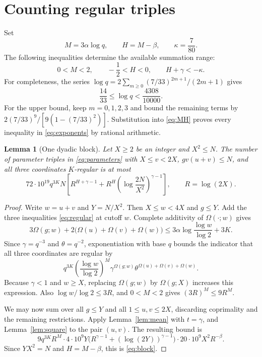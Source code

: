 \documentclass[11pt]{amsart}
\newtheorem{lemma}[theorem]{Lemma}
\theoremstyle{definition}
\theoremstyle{remark}
\numberwithin{equation}{section}
\newcommand{\Om}{\Omega}
\begin{document}
\section{Counting regular triples}\label{sec:count}

Set
\begin{equation}\label{eq:MH}
M=3\alpha\log q,\qquad H=M-\beta,\qquad\kappa=\frac7{80}.
\end{equation}
The following inequalities determine the available summation range:
\begin{equation}\label{eq:exponents}
0<M<2,\qquad -\frac12<H<0,\qquad H+\gamma<-\kappa.
\end{equation}
For completeness, the series
$\log q=2\sum_{m\ge0}(7/33)^{2m+1}/(2m+1)$ gives
\[
\frac{14}{33}\le\log q<\frac{4308}{10000}.
\]
For the upper bound, keep $m=0,1,2,3$ and bound the remaining terms by
$2(7/33)^9/[9(1-(7/33)^2)]$.
Substitution into \eqref{eq:MH} proves every inequality in \eqref{eq:exponents} by rational arithmetic.

\begin{lemma}[One dyadic block]\label{lem:block}
Let $X\ge2$ be an integer and $X^2\le N$.
The number of parameter triples in \eqref{eq:parameters} with
$X\le v<2X$, $gv(u+v)\le N$, and all three coordinates $K$-regular is at most
\begin{equation}\label{eq:block}
72\cdot10^{19}q^{3K}N
\left[R^{H+\gamma-1}+R^H\left(\log\frac{2N}{X^2}\right)^{\gamma-1}\right],
\qquad R=\log(2X).
\end{equation}
\end{lemma}

\begin{proof}
Write $w=u+v$ and $Y=N/X^2$.
Then $X\le w<4X$ and $g\le Y$.
Add the three inequalities \eqref{eq:regular} at cutoff $w$.
Complete additivity of $\Om(\cdot;w)$ gives
\[
3\Om(g;w)+2\bigl(\Om(u)+\Om(v)+\Om(w)\bigr)
\le3\alpha\log\frac{\log w}{\log2}+3K.
\]
Since $\gamma=q^{-3}$ and $\theta=q^{-2}$, exponentiation with base $q$ bounds the indicator that all three coordinates are regular by
\begin{equation}\label{eq:pointweight}
q^{3K}\left(\frac{\log w}{\log2}\right)^M
\gamma^{\Om(g;w)}\theta^{\Om(u)+\Om(v)+\Om(w)}.
\end{equation}
Because $\gamma<1$ and $w\ge X$, replacing $\Om(g;w)$ by $\Om(g;X)$ increases this expression.
Also $\log w/\log2\le3R$, and $0<M<2$ gives $(3R)^M\le9R^M$.

We may now sum over all $g\le Y$ and all $1\le u,v\le2X$, discarding coprimality and the remaining restrictions.
Apply Lemma~\ref{lem:mean} with $t=\gamma$, and Lemma~\ref{lem:square} to the pair $(u,v)$.
The resulting bound is
\[
9q^{3K}R^M\cdot4\cdot10^9Y
\bigl(R^{\gamma-1}+(\log(2Y))^{\gamma-1}\bigr)
\cdot20\cdot10^9X^2R^{-\beta}.
\]
Since $YX^2=N$ and $H=M-\beta$, this is \eqref{eq:block}.
\end{proof}
\end{document}
